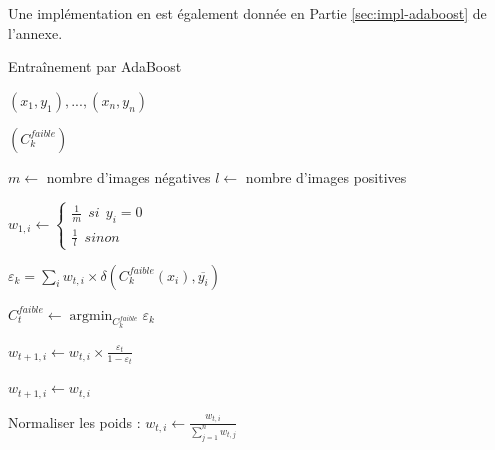\documentclass[12pt,a4paper]{article}
\DeclareMathOperator*{\argmin}{argmin}
\begin{document}
Une implémentation en est également donnée en Partie \ref{sec:impl-adaboost} de l'annexe.

\begin{algorithm}[H]
    \caption{Entraînement par AdaBoost}
    \label{algo:adaboost}
    \begin{algorithmic}
        \Input

        $(x_1, y_1), ..., (x_n, y_n)$ 

        $(C_k^{faible})$ 

        \EndInput
        \State $m \gets$ nombre d'images négatives
        \State $l \gets$ nombre d'images positives
         

            \State $w_{1, i} \gets \begin{cases} 
                \frac{1}{m} \:\: si \:\: y_i = 0 \\
                \frac{1}{l} \:\: sinon
                \end{cases}$ 
                
        \EndFor


                \State $\varepsilon_k = \sum_i w_{t,i} \times \delta(C_k^{faible}(x_i), \overline{y_i})$ 
            \EndFor

            \State $C_t^{faible} \gets \argmin_{C_k^{faible}} \varepsilon_k$
             

                \State $w_{t+1, i} \gets w_{t, i} \times \frac{\varepsilon_t}{1- \varepsilon_t}$ 

            \Else
                \State $w_{t+1, i} \gets w_{t, i}$ 
            \EndIf

            \EndFor
            \State Normaliser les poids : $w_{t, i} \gets \frac{w_{t, i}}{\sum_{j=1}^n w_{t, j}}$
        \EndFor
    \end{algorithmic}
\end{algorithm}
\end{document}
